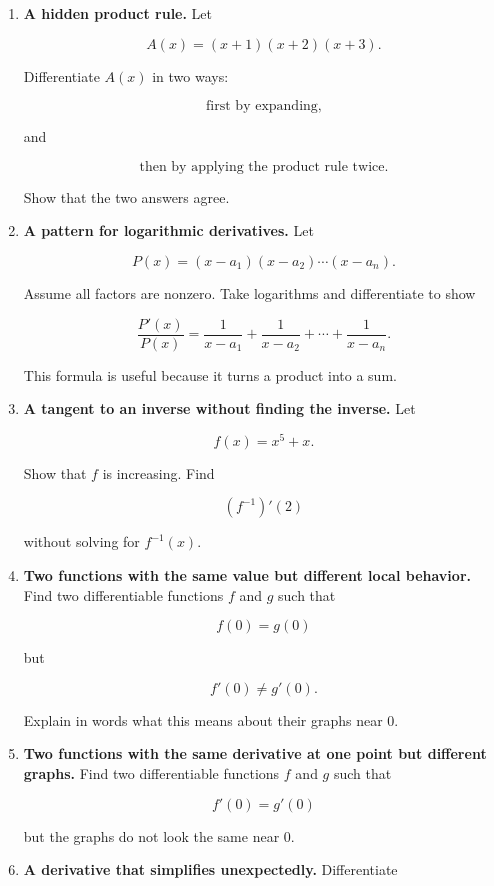 \begin{enumerate}
\item \textbf{A hidden product rule.}
Let

\[
A(x)=(x+1)(x+2)(x+3).
\]

Differentiate \(A(x)\) in two ways:

\[
\text{first by expanding,}
\]

and

\[
\text{then by applying the product rule twice.}
\]

Show that the two answers agree.

\item \textbf{A pattern for logarithmic derivatives.}
Let

\[
P(x)=(x-a_1)(x-a_2)\cdots(x-a_n).
\]

Assume all factors are nonzero.  Take logarithms and differentiate to show

\[
\frac{P'(x)}{P(x)}
=
\frac1{x-a_1}+\frac1{x-a_2}+\cdots+\frac1{x-a_n}.
\]

This formula is useful because it turns a product into a sum.

\item \textbf{A tangent to an inverse without finding the inverse.}
Let

\[
f(x)=x^5+x.
\]

Show that \(f\) is increasing.  Find

\[
(f^{-1})'(2)
\]

without solving for \(f^{-1}(x)\).

\item \textbf{Two functions with the same value but different local behavior.}
Find two differentiable functions \(f\) and \(g\) such that

\[
f(0)=g(0)
\]

but

\[
f'(0)\neq g'(0).
\]

Explain in words what this means about their graphs near \(0\).

\item \textbf{Two functions with the same derivative at one point but different graphs.}
Find two differentiable functions \(f\) and \(g\) such that

\[
f'(0)=g'(0)
\]

but the graphs do not look the same near \(0\).

\item \textbf{A derivative that simplifies unexpectedly.}
Differentiate


\end{enumerate}
